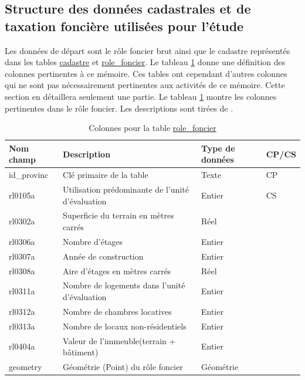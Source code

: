     \subsection{Structure des données cadastrales et de taxation foncière utilisées pour l'étude}
        Les données de départ sont le rôle foncier brut ainsi que le cadastre représentés dans les tables \underline{cadastre} et \underline{role\_foncier}. Le tableau \ref{tab:definition_role_foncier} donne une définition des colonnes pertinentes à ce mémoire. Ces tables ont cependant d'autres colonnes qui ne sont pas nécessairement pertinentes aux activités de ce mémoire. Cette section en détaillera seulement une partie. Le tableau \ref{tab:definition_role_foncier} montre les colonnes pertinentes dans le rôle foncier. Les descriptions sont tirées de \textcite{gouvernement_du_quebec_donnees_2022}.\par
        \begin{table}[h]
           \centering
           \begin{tabular}{m{}|m{}m{}m{}}
                \hline
                Nom champ & Description & Type de données & CP/CS  \\
                \hline
                id\_provinc & Clé primaire de la table & Texte & CP \\  
                rl0105a & Utilisation prédominante de l'unité d'évaluation & Entier & CS  \\
                rl0302a & Superficie du terrain en mètres carrés & Réel & \\ 
                rl0306a & Nombre d'étages & Entier & \\
                rl0307a & Année de construction & Entier & \\
                rl0308a & Aire d'étages en mètres carrés & Réel & \\
                rl0311a & Nombre de logements dans l'unité d'évaluation & Entier &  \\
                rl0312a & Nombre de chambres locatives & Entier & \\
                rl0313a & Nombre de locaux non-résidentiels & Entier & \\
                rl0404a & Valeur de l'immeuble(terrain + bâtiment) & Entier & \\
                geometry & Géométrie (Point) du rôle foncier & Géométrie & \\
                \hline
           \end{tabular}
           \caption{Colonnes pour la table \underline{role\_foncier}}
           \label{tab:definition_role_foncier}
        \end{table}   
